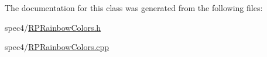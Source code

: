 The documentation for this class was generated from the following files:\begin{DoxyCompactItemize}
\item 
spec4/\hyperlink{RPRainbowColors_8h}{RPRainbowColors.h}\item 
spec4/\hyperlink{RPRainbowColors_8cpp}{RPRainbowColors.cpp}\end{DoxyCompactItemize}
